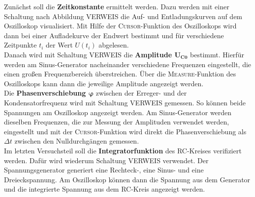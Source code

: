 Zunächst soll die \textbf{Zeitkonstante} ermittelt werden. Dazu werden mit einer Schaltung nach Abbildung VERWEIS die Auf- und Entladungskurven auf dem Oszilloskop visualisiert. Mit Hilfe der \textsc{Cursor}-Funktion des Oszilloskops wird dann bei einer Aufladekurve der Endwert bestimmt und für verschiedene Zeitpunkte $t_i$ der Wert $U(t_i)$ abgelesen. \\
Danach wird mit Schaltung VERWEIS die \textbf{Amplitude $\bm{U_{\text{C}0}}$} bestimmt. Hierfür werden am Sinus-Generator nacheinander verschiedene Frequenzen eingestellt, die einen großen Frequenzbereich überstreichen. Über die \textsc{Measure}-Funktion des Oszilloskops kann dann die jeweilige Amplitude angezeigt werden. \\
Die \textbf{Phasenverschiebung $\bm{\varphi}$} zwischen der Erreger- und der Kondensatorfrequenz wird mit Schaltung VERWEIS gemessen. So können beide Spannungen am Oszilloskop angezeigt werden. Am Sinus-Generator werden dieselben Frequenzen, die zur Messung der Amplituden verwendet werden, eingestellt und mit der \textsc{Cursor}-Funktion wird direkt die Phasenverschiebung als $\Delta t$ zwischen den Nulldurchgängen gemessen. \\
Im letzten Versuchsteil soll die \textbf{Integratorfunktion} des RC-Kreises verifiziert werden. Dafür wird wiederum Schaltung VERWEIS verwendet. Der Spannungsgenerator generiert eine Rechteck-, eine Sinus- und eine Dreieckspannung. Am Oszilloskop können dann die Spannung aus dem Generator und die integrierte Spannung aus dem RC-Kreis angezeigt werden.